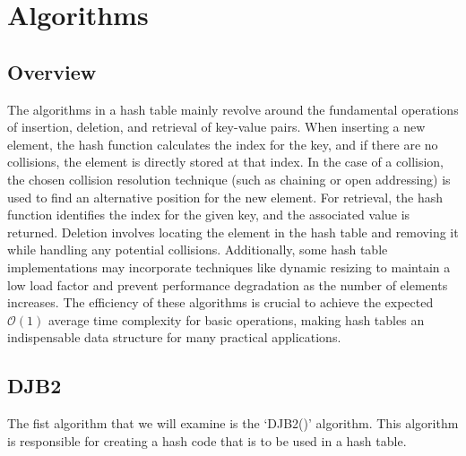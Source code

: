 \documentclass[a4paper,9pt]{article}
\begin{document}
\clearpage

\section*{Algorithms}

\subsection*{Overview}

The algorithms in a hash table mainly revolve around the fundamental operations of insertion, deletion, and retrieval of key-value pairs. When inserting a new element, the hash function calculates the index 
for the key, and if there are no collisions, the element is directly stored at that index. In the case of a collision, the chosen collision resolution technique (such as chaining or open addressing) is used 
to find an alternative position for the new element. For retrieval, the hash function identifies the index for the given key, and the associated value is returned. Deletion involves locating the element in 
the hash table and removing it while handling any potential collisions. Additionally, some hash table implementations may incorporate techniques like dynamic resizing to maintain a low load factor and prevent 
performance degradation as the number of elements increases. The efficiency of these algorithms is crucial to achieve the expected $\mathcal{O}(1)$ average time complexity for basic operations, making hash 
tables an indispensable data structure for many practical applications.

\subsection*{DJB2}

The fist algorithm that we will examine is the `DJB2()' algorithm. This algorithm is responsible for creating a hash code that is to be used in a hash table.
\end{document}
